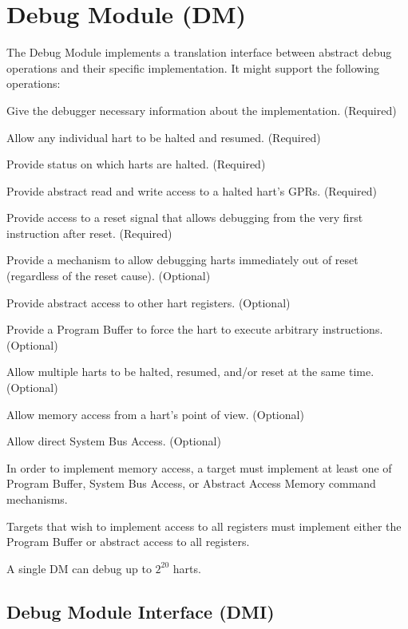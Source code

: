 \chapter{Debug Module (DM)} \label{dm}

\begin{steps}{The Debug Module implements a translation interface between abstract debug
    operations and their specific implementation. It might support the following
    operations:}
\item Give the debugger necessary information about the implementation. (Required)
\item Allow any individual hart to be halted and resumed. (Required)
\item Provide status on which harts are halted. (Required)
\item Provide abstract read and write access to a halted hart's GPRs. (Required)
\item Provide access to a reset signal that allows debugging from the very
    first instruction after reset. (Required)
\item Provide a mechanism to allow debugging harts immediately out of reset
      (regardless of the reset cause). (Optional)
\item Provide abstract access to other hart registers. (Optional)
\item Provide a Program Buffer to force the hart to execute arbitrary instructions. (Optional)
\item Allow multiple harts to be halted, resumed, and/or reset at the same time. (Optional)
\item Allow memory access from a hart's point of view. (Optional)
\item Allow direct System Bus Access. (Optional)
\end{steps}

In order to implement memory access, a target must implement at least one of
Program Buffer, System Bus Access, or Abstract Access Memory command
mechanisms.

Targets that wish to implement access to all registers must implement either
the Program Buffer or abstract access to all registers.

A single DM can debug up to $2^{20}$ harts.

\section{Debug Module Interface (DMI)} \label{dmi}

